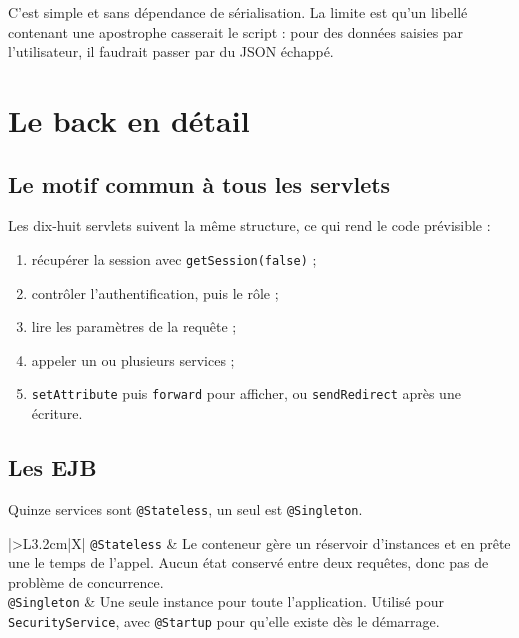 C'est simple et sans dépendance de sérialisation. La limite est qu'un libellé
contenant une apostrophe casserait le script : pour des données saisies par
l'utilisateur, il faudrait passer par du JSON échappé.

\section{Le back en détail}

\subsection{Le motif commun à tous les servlets}

Les dix-huit servlets suivent la même structure, ce qui rend le code
prévisible :

\begin{enumerate}[leftmargin=*,itemsep=1pt]
  \item récupérer la session avec \texttt{getSession(false)} ;
  \item contrôler l'authentification, puis le rôle ;
  \item lire les paramètres de la requête ;
  \item appeler un ou plusieurs services ;
  \item \texttt{setAttribute} puis \texttt{forward} pour afficher, ou
        \texttt{sendRedirect} après une écriture.
\end{enumerate}

\subsection{Les EJB}

Quinze services sont \texttt{@Stateless}, un seul est \texttt{@Singleton}.

\noindent\begin{tabularx}{\textwidth}{|>{\bfseries}L{3.2cm}|X|}
\hline
\texttt{@Stateless} & Le conteneur gère un réservoir d'instances et en prête une le temps de l'appel. Aucun état conservé entre deux requêtes, donc pas de problème de concurrence.\\
\hline
\texttt{@Singleton} & Une seule instance pour toute l'application. Utilisé pour \texttt{SecurityService}, avec \texttt{@Startup} pour qu'elle existe dès le démarrage.\\
\hline
\end{tabularx}

